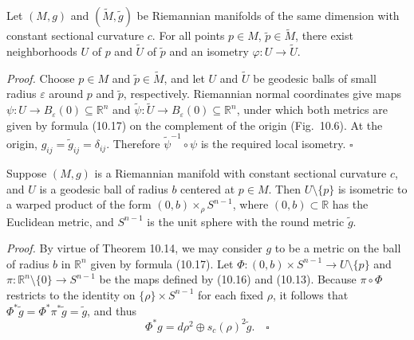 
\begin{corollary}
\label{cor:local-uniqueness-constant-curvature}

Let $(M, g)$ and $(\tilde{M}, \tilde{g})$ be Riemannian manifolds of the same dimension with constant sectional curvature $c$. For all points $p \in M$, $\tilde{p} \in \tilde{M}$, there exist neighborhoods $U$ of $p$ and $\tilde{U}$ of $\tilde{p}$ and an isometry $\varphi: U \to \tilde{U}$.

\textit{Proof.} Choose $p \in M$ and $\tilde{p} \in \tilde{M}$, and let $U$ and $\tilde{U}$ be geodesic balls of small radius $\varepsilon$ around $p$ and $\tilde{p}$, respectively. Riemannian normal coordinates give maps $\psi: U \to B_\varepsilon(0) \subseteq \mathbb{R}^n$ and $\tilde{\psi}: \tilde{U} \to B_\varepsilon(0) \subseteq \mathbb{R}^n$, under which both metrics are given by formula (10.17) on the complement of the origin (Fig.\ 10.6). At the origin, $g_{ij} = \tilde{g}_{ij} = \delta_{ij}$. Therefore $\tilde{\psi}^{-1} \circ \psi$ is the required local isometry. \quad $\square$
\end{corollary}

\begin{corollary}
\label{cor:constant-curvature-warped-products}

Suppose $(M, g)$ is a Riemannian manifold with constant sectional curvature $c$, and $U$ is a geodesic ball of radius $b$ centered at $p \in M$. Then $U \setminus \{p\}$ is isometric to a warped product of the form $(0,b) \times_\rho S^{n-1}$, where $(0,b) \subset \mathbb{R}$ has the Euclidean metric, and $S^{n-1}$ is the unit sphere with the round metric $\tilde{g}$.

\textit{Proof.} By virtue of Theorem 10.14, we may consider $g$ to be a metric on the ball of radius $b$ in $\mathbb{R}^n$ given by formula (10.17). Let $\Phi: (0,b) \times S^{n-1} \to U \setminus \{p\}$ and $\pi: \mathbb{R}^n \setminus \{0\} \to S^{n-1}$ be the maps defined by (10.16) and (10.13). Because $\pi \circ \Phi$ restricts to the identity on $\{\rho\} \times S^{n-1}$ for each fixed $\rho$, it follows that $\Phi^* \tilde{g} = \Phi^* \pi^* \tilde{g} = \tilde{g}$, and thus
\[
\Phi^* g = d\rho^2 \oplus s_c(\rho)^2 \tilde{g}. \quad \square
\]
\end{corollary}

